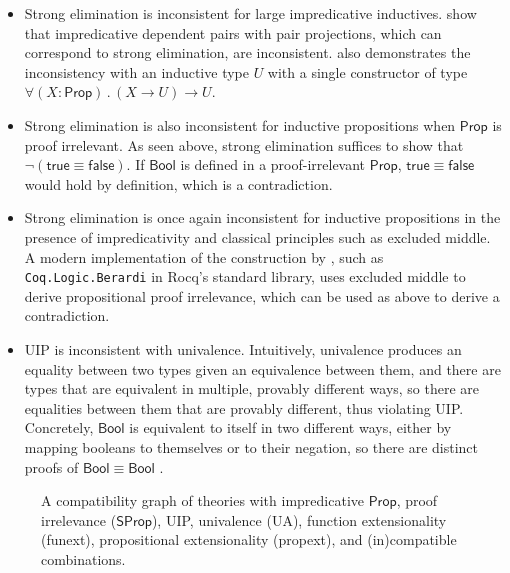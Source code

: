 \documentclass{article}
\newcommand{\kw}[1]{\mathsf{#1}}
\newcommand{\code}[1]{\texttt{#1}}
\begin{document}
\begin{itemize}[noitemsep,topsep=0pt]
  \item Strong elimination is inconsistent for large impredicative inductives.
    \citet{strong-pair} show that impredicative dependent pairs with pair projections,
    which can correspond to strong elimination,
    are inconsistent.
    \citet{trees} also demonstrates the inconsistency with an inductive type $U$
    with a single constructor of type
    $\forall (X : \kw{Prop})\mathpunct{.} (X \to U) \to U$.
  \item Strong elimination is also inconsistent for inductive propositions
    when $\kw{Prop}$ is proof irrelevant.
    As seen above, strong elimination suffices to show that $\neg (\kw{true} \equiv \kw{false})$.
    If $\kw{Bool}$ is defined in a proof-irrelevant $\kw{Prop}$,
    $\kw{true} \equiv \kw{false}$ would hold by definition,
    which is a contradiction.
  \item Strong elimination is once again inconsistent for inductive propositions
    in the presence of impredicativity and classical principles such as excluded middle.
    A modern implementation of the construction by \cite{em-irr},
    such as \code{Coq.Logic.Berardi} in Rocq's standard library,
    uses excluded middle to derive propositional proof irrelevance,
    which can be used as above to derive a contradiction.
  \item UIP is inconsistent with univalence.
    Intuitively, univalence produces an equality between two types
    given an equivalence between them,
    and there are types that are equivalent in multiple, provably different ways,
    so there are equalities between them that are provably different,
    thus violating UIP.
    Concretely, $\kw{Bool}$ is equivalent to itself in two different ways,
    either by mapping booleans to themselves or to their negation,
    so there are distinct proofs of $\kw{Bool} \equiv \kw{Bool}$
    \citep[Example 3.1.9]{hott}.
\end{itemize}

\begin{figure}[ht]
\centering
{}
\caption{A compatibility graph of theories with impredicative $\kw{Prop}$, proof irrelevance ($\kw{SProp}$),
  UIP, univalence (UA), function extensionality (funext), propositional extensionality (propext),
  and (in)compatible combinations.}
\label{fig:lattice}
\end{figure}
\end{document}
